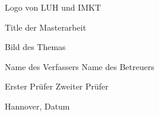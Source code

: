 Logo von LUH und IMKT

Title der Masterarbeit

Bild des Themas

Name des Verfassers             Name des Betreuers

Erster Prüfer
Zweiter Prüfer

Hannover, Datum

